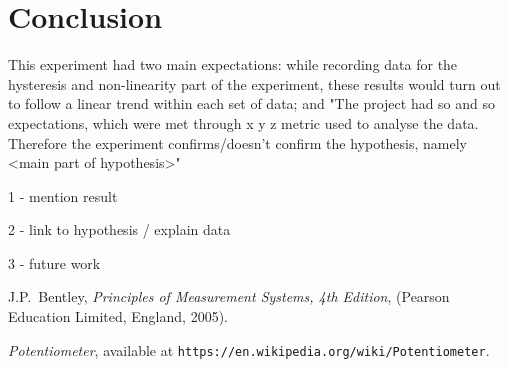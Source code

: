 \documentclass[a4,11pt]{article}
\begin{document}
\section{Conclusion}
 This experiment had two main expectations: while recording data for the hysteresis and non-linearity part of the experiment, these results would turn out to follow a linear trend within each set of data; and 
 "The project had so and so expectations, which were met through x y z metric used to analyse the data. Therefore the experiment confirms/doesn't confirm the hypothesis, namely <main part of hypothesis>"

1 - mention result

2 - link to hypothesis / explain data

3 - future work
\onecolumn
\begin{thebibliography}{99}
	
	J.P.\ Bentley, \textit{Principles of Measurement Systems, 4th Edition},
	(Pearson Education Limited, England, 2005).
	
	 \emph{Potentiometer},   available at
	\texttt{https://en.wikipedia.org/wiki/Potentiometer}.
	
\end{thebibliography}
\appendix
\end{document}
